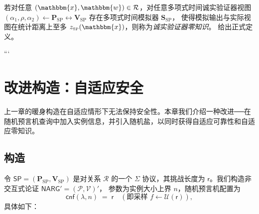 \documentclass[american,singlepageview]{snargs-book-zh}
\newcommand{\Relation}{\mathcal{R}}
\newcommand{\Instance}{\mathbbm{x}}
\newcommand{\Witness}{\mathbbm{w}}
\newcommand{\InstanceSize}{n}
\newcommand{\ProtoProver}{P}
\newcommand{\ProtoVerifier}{V}
\newcommand{\ProtoSimulator}{S}
\newcommand{\ProtoZKError}{z}
\newcommand{\ProtoRandomnessComplexity}{\mathsf{r}}
\newcommand{\SPSymbol}{\mathsf{SP}}
\newcommand{\SPSubscript}{\scriptscriptstyle\mathrm{SP}}
\newcommand{\SPFormat}[1]{\mathbf{#1}}
\newcommand{\SPProver}{\SPFormat{\ProtoProver}_{\SPSubscript}}
\newcommand{\SPVerifier}{\SPFormat{\ProtoVerifier}_{\SPSubscript}}
\newcommand{\SPSimulator}{\SPFormat{\ProtoSimulator}_{\SPSubscript}}
\newcommand{\SPZKError}{\ProtoZKError_{\SPSubscript}}
\newcommand{\SPSystem}{(\SPProver,\SPVerifier)}
\newcommand{\SPCommitment}{\alpha_{1}}
\newcommand{\SPChallenge}{\rho}
\newcommand{\SPResponse}{\alpha_{2}}
\newcommand{\SPRandomnessComplexity}{\ProtoRandomnessComplexity}
\newcommand{\NARGSymbol}{\mathsf{NARG}}
\newcommand{\ARGFormat}[1]{\mathcal{#1}}
\newcommand{\ARGOracles}{\mathsf{cnf}}
\newcommand{\ARGProver}{\ARGFormat{\ProtoProver}}
\newcommand{\ARGVerifier}{\ARGFormat{\ProtoVerifier}}
\newcommand{\ARGSystem}{(\ARGProver,\ARGVerifier)}
\newcommand{\ROFunction}{f}
\newcommand{\RODistribution}[1]{\mathcal{U}(#1)}
\newcommand{\SecurityParameter}{\lambda}
\begin{document}
若对任意 $(\Instance,\Witness)\in\Relation$，对任意多项式时间诚实验证器视图
\(
  (\SPCommitment,\SPChallenge,\SPResponse)\!\gets\!\SPProver\leftrightarrow\SPVerifier
\)
存在多项式时间模拟器 $\SPSimulator$，
使得模拟输出与实际视图在统计距离上至多 $\SPZKError(\Instance)$，则称为\emph{诚实验证器零知识}。 给出正式定义。

```\!

\chapter{改进构造：自适应安全}
\label{chapter:narg-from-sp-construction}

上一章的暖身构造在自适应情形下无法保持安全性。本章我们介绍一种改进──在随机预言机查询中加入实例信息，并引入随机盐，以同时获得自适应可靠性和自适应零知识。

\section{构造}
\label{section:narg-from-sp-construction}

令 $\SPSymbol=\SPSystem$ 是对关系 $\Relation$ 的一个 $\Sigma$ 协议，其挑战长度为 $\SPRandomnessComplexity$。我们构造非交互式论证 $\NARGSymbol'=\ARGSystem'$， 参数为实例大小上界 $\InstanceSize$，随机预言机配置为
\[
  \ARGOracles(\SecurityParameter,\InstanceSize)
  \;=\;
  \SPRandomnessComplexity
  \quad(\text{即采样 } \ROFunction\!\gets\!\RODistribution{\SPRandomnessComplexity}),
\]
具体如下：
\end{document}

